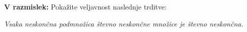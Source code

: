 \documentclass[11pt,paper=b5,DIV=13,headinclude,footinclude]{scrbook}
\def\inn {{~\wedge~}}
\def\sledi {{~\Rightarrow~}}
\def\cee {{~\Leftrightarrow~}}
\begin{document}
\begin{enumerate}[(1.)]
\medskip
\textbf{V razmislek:} Pokažite veljavnost naslednje trditve:

{\em Vsaka neskončna podmnožica števno neskončne množice je števno neskončna.}


%
%
%
%
%
%
%
%
%
%
%
%
%
%
%
%
%
%


\end{enumerate}
\end{document}

